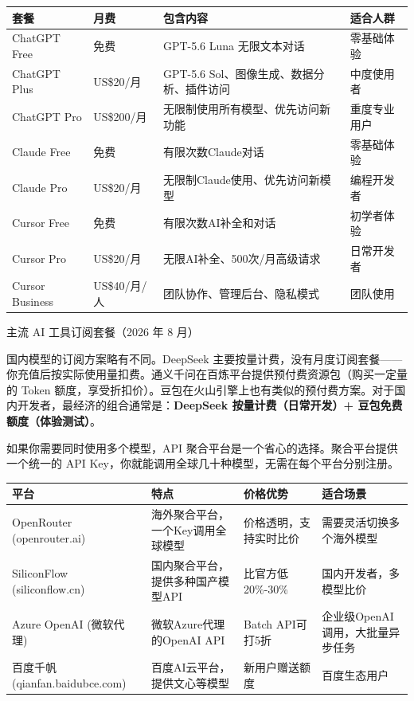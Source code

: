 \begin{center}
\begin{tabularx}{\linewidth}{|X|X|X|X|}
\hline
\textbf{套餐} & \textbf{月费} & \textbf{包含内容} & \textbf{适合人群} \tabularnewline
\hline
ChatGPT Free & 免费 & GPT-5.6 Luna 无限文本对话 & 零基础体验 \tabularnewline
ChatGPT Plus & US\$20/月 & GPT-5.6 Sol、图像生成、数据分析、插件访问 & 中度使用者 \tabularnewline
ChatGPT Pro & US\$200/月 & 无限制使用所有模型、优先访问新功能 & 重度专业用户 \tabularnewline
Claude Free & 免费 & 有限次数Claude对话 & 零基础体验 \tabularnewline
Claude Pro & US\$20/月 & 无限制Claude使用、优先访问新模型 & 编程开发者 \tabularnewline
Cursor Free & 免费 & 有限次数AI补全和对话 & 初学者体验 \tabularnewline
Cursor Pro & US\$20/月 & 无限AI补全、500次/月高级请求 & 日常开发者 \tabularnewline
Cursor Business & US\$40/月/人 & 团队协作、管理后台、隐私模式 & 团队使用 \tabularnewline
\hline
\end{tabularx}
\end{center}

\begin{center}\small\color{gray}主流 AI 工具订阅套餐（2026 年 8 月）\end{center}

国内模型的订阅方案略有不同。DeepSeek 主要按量计费，没有月度订阅套餐——你充值后按实际使用量扣费。通义千问在百炼平台提供预付费资源包（购买一定量的 Token 额度，享受折扣价）。豆包在火山引擎上也有类似的预付费方案。对于国内开发者，最经济的组合通常是：\textbf{DeepSeek 按量计费（日常开发）+ 豆包免费额度（体验测试）}。


如果你需要同时使用多个模型，API 聚合平台是一个省心的选择。聚合平台提供一个统一的 API Key，你就能调用全球几十种模型，无需在每个平台分别注册。

\begin{center}
\begin{tabularx}{\linewidth}{|X|X|X|X|}
\hline
\textbf{平台} & \textbf{特点} & \textbf{价格优势} & \textbf{适合场景} \tabularnewline
\hline
OpenRouter (openrouter.ai) & 海外聚合平台，一个Key调用全球模型 & 价格透明，支持实时比价 & 需要灵活切换多个海外模型 \tabularnewline
SiliconFlow (siliconflow.cn) & 国内聚合平台，提供多种国产模型API & 比官方低20\%-30\% & 国内开发者，多模型比价 \tabularnewline
Azure OpenAI (微软代理) & 微软Azure代理的OpenAI API & Batch API可打5折 & 企业级OpenAI调用，大批量异步任务 \tabularnewline
百度千帆 (qianfan.baidubce.com) & 百度AI云平台，提供文心等模型 & 新用户赠送额度 & 百度生态用户 \tabularnewline
\hline
\end{tabularx}
\end{center}

